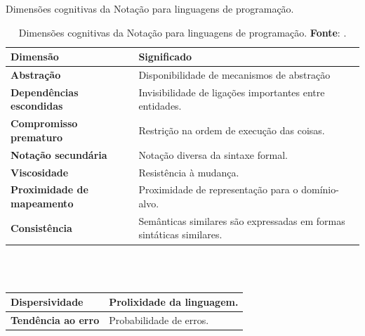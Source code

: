 \documentclass[aspectratio=169]{beamer}
\begin{document}
\begin{frame}[allowframebreaks]{Dimensões cognitivas da Notação para linguagens de programação.}
\begin{table}[!h]
\caption{Dimensões cognitivas da Notação para linguagens de programação. \textbf{Fonte}: .}
\small
    \begin{tabular}{ | p{5cm}| p{5cm} |}
    \hline 
    \hline 

    \tiny \textbf{Dimensão} & \textbf{Significado} \\
    \hline 
    \hline 

    \tiny \textbf{Abstração}  
    & \tiny Disponibilidade de mecanismos de abstração \\
    \hline

    \tiny \textbf{Dependências escondidas}

    & \tiny Invisibilidade de ligações importantes entre entidades.\\
    \hline
    
    \tiny \textbf{Compromisso prematuro}  
    & \tiny Restrição na ordem de execução das coisas. \\
  \hline

    \tiny \textbf{Notação secundária}  
    & \tiny Notação diversa da sintaxe formal. \\
    \hline

    \tiny \textbf{Viscosidade}  
    & \tiny Resistência à mudança. \\
    \hline

    \tiny \textbf{Proximidade de mapeamento}  
    & \tiny Proximidade de representação para o domínio-alvo. \\
    \hline

    \tiny \textbf{Consistência}  
    & \tiny Semânticas similares são expressadas em formas sintáticas similares. \\
    \hline
    \hline
    \end{tabular}
\label{tab:dimensoes}
\end{table} 
\ \\
\ \\
\begin{table}[!h]
\small
\begin{tabular}{ | p{5cm}| p{5cm} |}
    \hline 
    \hline 
    \tiny \textbf{Dispersividade}  
    & \tiny Prolixidade da linguagem. \\
    \hline
    
    \tiny \textbf{Tendência ao erro}  
    & \tiny Probabilidade de erros. \\
    \hline


\end{tabular}
\end{table}
\end{frame}
\end{document}
